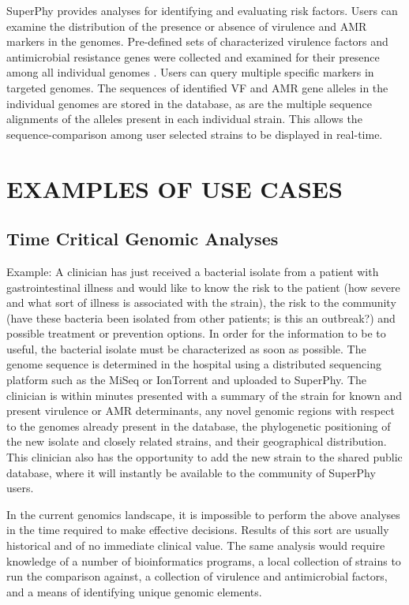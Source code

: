 \documentclass[a4paper,twoside]{article}
\begin{document}
SuperPhy provides analyses for identifying and evaluating risk factors. Users can examine the distribution of the presence or absence of virulence and AMR markers in the genomes.  Pre-defined sets of characterized virulence factors and antimicrobial resistance genes were collected and examined for their presence among all individual genomes \cite{mcarthur2012card,chen2012vfdb,chen2005vfdb}. Users can query multiple specific markers in targeted genomes. The sequences of identified VF and AMR gene alleles in the individual genomes are stored in the database, as are the multiple sequence alignments of the alleles present in each individual strain. This allows the sequence-comparison among user selected strains to be displayed in real-time. 

\section{\uppercase{Examples of Use Cases}}
\label{sec:cases}
\subsection{Time Critical Genomic Analyses}
Example: A clinician has just received a bacterial isolate from a patient with gastrointestinal illness and would like to know the risk to the patient (how severe and what sort of illness is associated with the strain), the risk to the community (have these bacteria been isolated from other patients; is this an outbreak?) and possible treatment or prevention options. In order for the information to be to useful, the bacterial isolate must be characterized as soon as possible. The genome sequence is determined in the hospital using a distributed sequencing platform such as the MiSeq or IonTorrent and uploaded to SuperPhy. The clinician is within minutes presented with a summary of the strain for known and present virulence or AMR determinants, any novel genomic regions with respect to the genomes already present in the database, the phylogenetic positioning of the new isolate and closely related strains, and their geographical distribution. This clinician also has the opportunity to add the new strain to the shared public database, where it will instantly be available to the community of SuperPhy users.

In the current genomics landscape, it is impossible to perform the above analyses in the time required to make effective decisions. Results of this sort are usually historical and of no immediate clinical value. The same analysis would require knowledge of a number of bioinformatics programs, a local collection of strains to run the comparison against, a collection of virulence and antimicrobial factors, and a means of identifying unique genomic elements.
\end{document}

